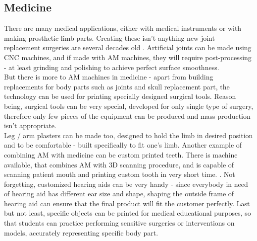 \documentclass[a4paper, twoside, 11pt]{report}
\begin{document}
\subsection{Medicine}
There are many medical applications, either with medical instruments or with making prosthetic limb parts. Creating these isn't anything new joint replacement surgeries are several decades old \cite{JointReplacement}. Artificial joints can be made using CNC machines, and if made with AM machines, they will require post-processing - at least grinding and polishing to achieve perfect surface smoothness.\\
But there is more to AM machines in medicine - apart from building replacements for body parts such as joints and skull replacement part, the technology can be used for printing specially designed surgical tools. Reason being, surgical tools can be very special, developed for only single type of surgery, therefore only few pieces of the equipment can be produced and mass production isn't appropriate.\\
Leg / arm plasters can be made too, designed to hold the limb in desired position and to be comfortable - built specifically to fit one's limb. Another example of combining AM with medicine can be custom printed teeth. There is machine available, that combines AM with 3D scanning procedure, and is capable of scanning patient mouth and printing custom tooth in very short time. \cite{DentalPrinter}. Not forgetting, customized hearing aids can be very handy - since everybody in need of hearing aid has different ear size and shape, shaping the outside frame of hearing aid can ensure that the final product will fit the customer perfectly. Last but not least, specific objects can be printed for medical educational purposes, so that students can practice performing sensitive  surgeries or interventions on models, accurately representing specific body part.
%
\end{document}
